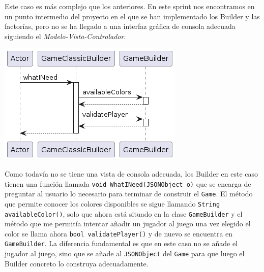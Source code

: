\documentclass[../DocumentoOficial.tex]{subfiles}
\begin{document}
\begin{sprint}[4]
Este caso es más complejo que los anteriores. En este sprint nos encontramos en un punto intermedio del proyecto en el que se han implementado los Builder y las factorías, pero no se ha llegado a una interfaz gráfica de consola adecuada siguiendo el \textit{Modelo-Vista-Controlador}.

\begin{center}
\includegraphics[scale=0.55]{ChooseColor_sprint4_seq}
\end{center}

Como todavía no se tiene una vista de consola adecuada, los Builder en este caso tienen una función llamada \texttt{void WhatINeed(JSONObject o)} que se encarga de preguntar al usuario lo necesario para terminar de construir el \texttt{Game}. El método que permite conocer los colores disponibles se sigue llamando \texttt{String availableColor()}, solo que ahora está situado en la clase \texttt{GameBuilder} y el método que me permitía intentar añadir un jugador al juego una vez elegido el color se llama ahora \texttt{bool validatePlayer()} y de nuevo se encuentra en \texttt{GameBuilder}. La diferencia fundamental es que en este caso no se añade el jugador al juego, sino que se añade al \texttt{JSONObject} del \texttt{Game} para que luego el Builder concreto lo construya adecuadamente.
\end{sprint}
\end{document}
